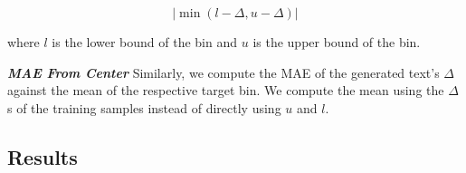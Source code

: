 \begin{equation}
    |\min(l - \Delta, u - \Delta)|
\end{equation}

where $l$ is the lower bound of the bin and $u$ is the upper bound of the bin.

\textit{\textbf{MAE From Center}} Similarly, we compute the MAE of the generated text's $\Delta$ against the mean of the respective target bin. We compute the mean using the $\Delta$s of the training samples instead of directly using $u$ and $l$. 

\subsection{Results}
\label{subsec:ac_results}

